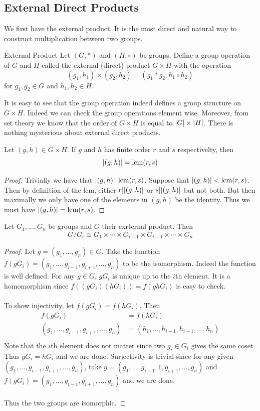\documentclass[a4paper]{article}
\begin{document}
\subsection{External Direct Products}
We first have the external product. It is the most direct and natural way to construct multiplication between two groups. 

\begin{defn}{External Product}{} Let $(G,\ast)$ and $(H,\circ)$ be groups. Define a group operation of $G$ and $H$ called the external (direct) product $G\times H$ with the operation $$(g_1,h_1)\times(g_2,h_2)=(g_1\ast g_2,h_1\circ h_2)$$ for $g_1,g_2\in G$ and $h_1,h_2\in H$. 
\end{defn}

It is easy to see that the group operation indeed defines a group structure on $G\times H$. Indeed we can check the group operations element wise. Moreover, from set theory we know that the order of $G\times H$ is equal to $\abs{G}\times\abs{H}$. There is nothing mysterious about external direct products. 

\begin{thm}{}{} Let $(g,h)\in G\times H$. If $g$ and $h$ has finite order $r$ and $s$ respectivelty, then $$\abs{(g,h)}=\operatorname{lcm}(r,s)$$ \tcbline
\begin{proof}
Trivially we have that $\abs{(g,h)}|\operatorname{lcm}(r,s)$. Suppose that $\abs{(g,h)}<\operatorname{lcm}(r,s)$. Then by definition of the lcm, either $r|\abs{(g,h)}$ or $s|\abs{(g,h)}$ but not both. But then maximally we only have one of the elements in $(g,h)$ be the identity. Thus we must have $\abs{(g,h)}=\operatorname{lcm}(r,s)$. 
\end{proof}
\end{thm}

\begin{prp}{}{} Let $G_1,\dots, G_n$ be groups and $G$ their exrternal product. Then $$G/G_i\cong G_1\times\cdots \times G_{i-1}\times G_{i+1}\times\cdots\times G_n$$\tcbline
\begin{proof}
Let $g=(g_1,\dots,g_n)\in G$. Take the function $f(gG_i)=(g_1,\dots,g_{i-1},g_{i+1},\dots,g_n)$ to be the isomorphism. Indeed the function is well defined. For any $g\in G$, $gG_i$ is unique up to the $i$th element. It is a homomorphism since $f((gG_i)(hG_i))=f(ghG_i)$ is easy to check. \\~\\
To show injectivity, let $f(gG_i)=f(hG_i)$. Then
\begin{align*}
f(gG_i)&=f(hG_i)\\
(g_1,\dots,g_{i-1},g_{i+1},\dots,g_n)&=(h_1,\dots,h_{i-1},h_{i+1},\dots,h_n)\\
\end{align*}
Note that the $i$th element does not matter since two $g_i\in G_i$ gives the same coset. Thus $gG_i=hG_i$ and we are done. Surjectivity is trivial since for any given $(g_1,\dots,g_{i-1},g_{i+1},\dots,g_n)$, take $g=(g_1,\dots,g_{i-1},1,g_{i+1},\dots,g_n)$ and $f(gG_i)=(g_1,\dots,g_{i-1},g_{i+1},\dots,g_n)$ and we are done. \\~\\
Thus the two groups are isomorphic. 
\end{proof}
\end{prp}
\end{document}

